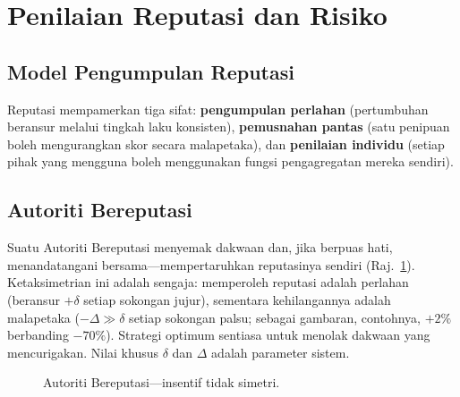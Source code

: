 \documentclass[11pt,a4paper,twocolumn]{article}
\begin{document}
\section{Penilaian Reputasi dan Risiko}

\subsection{Model Pengumpulan Reputasi}

Reputasi mempamerkan tiga sifat: \textbf{pengumpulan perlahan} (pertumbuhan beransur melalui tingkah laku konsisten), \textbf{pemusnahan pantas} (satu penipuan boleh mengurangkan skor secara malapetaka), dan \textbf{penilaian individu} (setiap pihak yang mengguna boleh menggunakan fungsi pengagregatan mereka sendiri).

\subsection{Autoriti Bereputasi}

Suatu Autoriti Bereputasi menyemak dakwaan dan, jika berpuas hati, menandatangani bersama---mempertaruhkan reputasinya sendiri (Raj.~\ref{fig:authority}). Ketaksimetrian ini adalah sengaja: memperoleh reputasi adalah perlahan (beransur $+\delta$ setiap sokongan jujur), sementara kehilangannya adalah malapetaka ($-\Delta \gg \delta$ setiap sokongan palsu; sebagai gambaran, contohnya, $+2\%$ berbanding $-70\%$). Strategi optimum sentiasa untuk menolak dakwaan yang mencurigakan. Nilai khusus $\delta$ dan $\Delta$ adalah parameter sistem.

\begin{figure}[ht]
\centering
{}
\caption{Autoriti Bereputasi---insentif tidak simetri.}
\label{fig:authority}
\end{figure}
\end{document}
